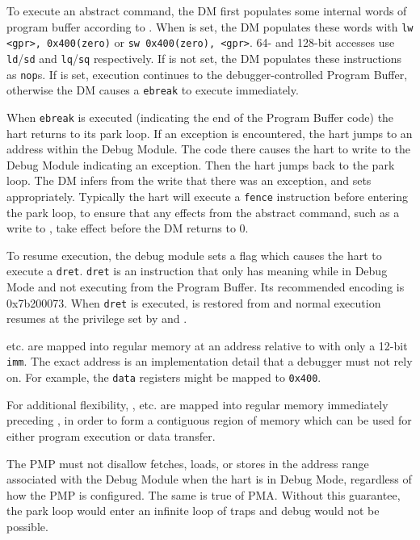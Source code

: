 To execute an abstract command, the DM first populates some internal words of
program buffer according to \RdmCommand. When \FacAccessregisterTransfer is set, the DM
populates these words with {\tt lw <gpr>, 0x400(zero)} or {\tt sw 0x400(zero), <gpr>}.
64- and 128-bit accesses use {\tt ld}/{\tt sd} and {\tt lq}/{\tt sq}
respectively. If \FacAccessregisterTransfer is not set, the DM populates these instructions as {\tt nop}s.
If \FacAccessregisterPostexec is set, execution continues to the debugger-controlled Program Buffer,
otherwise the DM causes a {\tt ebreak} to execute immediately.

When {\tt ebreak} is executed (indicating the end of the
Program Buffer code) the hart returns to its park loop. If an exception is
encountered, the hart jumps to an address within
the Debug Module. The code there causes the hart to
write to the Debug Module indicating an exception.
Then the hart jumps back to the park loop.
The DM infers from the write that there was an exception, and sets \FdmAbstractcsCmderr appropriately.
Typically the hart will execute a {\tt fence} instruction before entering the
park loop, to ensure that any effects from the abstract command, such as a
write to \RdmDataZero, take effect before the DM returns \FdmAbstractcsBusy
to 0.

To resume execution, the debug module sets a flag which causes the hart to execute a {\tt dret}.
{\tt dret} is an instruction that only has meaning while in Debug Mode and
not executing from the Program Buffer.
Its recommended encoding is 0x7b200073.
When {\tt dret} is executed, \Rpc is restored from \RcsrDpc and normal execution resumes at the
privilege set by \FcsrDcsrPrv and \FcsrDcsrV.

\RdmDataZero etc. are mapped into regular memory at an address relative to \Rzero
with only a 12-bit {\tt imm}. The exact address is an implementation
detail that a debugger must not rely on. For example, the {\tt data}
registers might be mapped to {\tt 0x400}.

For additional flexibility, \RdmProgbufZero, etc. are mapped into regular memory
immediately preceding \RdmDataZero, in order to form a contiguous region of memory which
can be used for either program execution or data transfer.

The PMP must not disallow fetches,
loads, or stores in the address range associated with the Debug Module when the
hart is in Debug Mode, regardless of how the PMP is configured.  The same is
true of PMA.  Without this guarantee, the park loop would enter an infinite
loop of traps and debug would not be possible.

